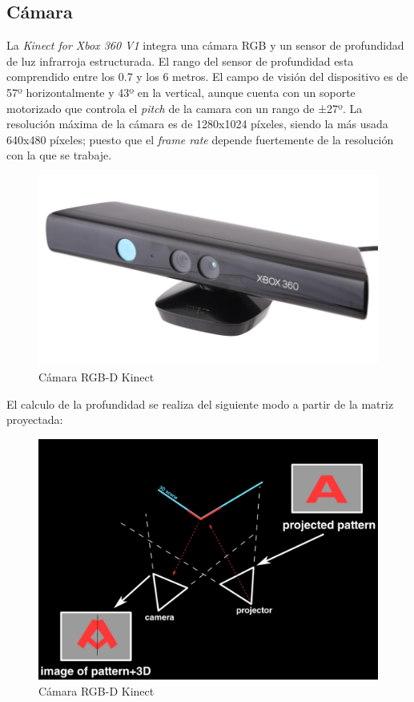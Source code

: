 \subsection{Cámara}
La \textit{Kinect for Xbox 360 V1} integra una cámara RGB y un sensor de profundidad de luz infrarroja estructurada. El rango del sensor de profundidad esta comprendido entre los 0.7 y los 6 metros. El campo de visión del dispositivo es de 57º horizontalmente y 43º en la vertical, aunque cuenta con un soporte motorizado que controla el \textit{pitch} de la camara con un rango de ±27º. La resolución máxima de la cámara es de 1280x1024 píxeles, siendo la más usada 640x480 píxeles; puesto que el \textit{frame rate} depende fuertemente de la resolución con la que se trabaje.
\begin{figure}[h!]
	\centering
	\includegraphics[width=.5\textwidth]{images/kinect}
	\caption{Cámara RGB-D Kinect}
\end{figure}

El calculo de la profundidad se realiza del siguiente modo a partir de la matriz proyectada:
\begin{figure}[h!]
	\centering
	\includegraphics[width=.4\textwidth]{images/kinect_teo}
	\caption{Cámara RGB-D Kinect}
\end{figure}

\newpage
